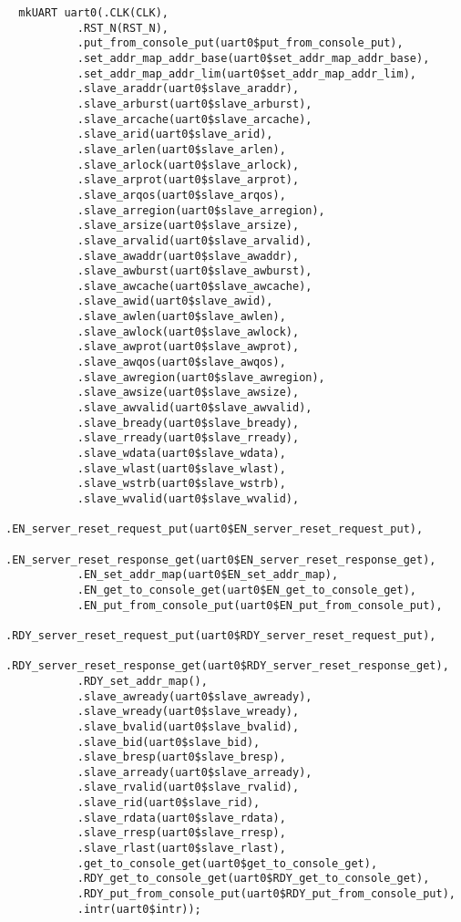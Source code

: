 \documentclass[a4paper,9pt]{report}
\begin{document}
\tiny
\begin{verbatim}
  mkUART uart0(.CLK(CLK),
	       .RST_N(RST_N),
	       .put_from_console_put(uart0$put_from_console_put),
	       .set_addr_map_addr_base(uart0$set_addr_map_addr_base),
	       .set_addr_map_addr_lim(uart0$set_addr_map_addr_lim),
	       .slave_araddr(uart0$slave_araddr),
	       .slave_arburst(uart0$slave_arburst),
	       .slave_arcache(uart0$slave_arcache),
	       .slave_arid(uart0$slave_arid),
	       .slave_arlen(uart0$slave_arlen),
	       .slave_arlock(uart0$slave_arlock),
	       .slave_arprot(uart0$slave_arprot),
	       .slave_arqos(uart0$slave_arqos),
	       .slave_arregion(uart0$slave_arregion),
	       .slave_arsize(uart0$slave_arsize),
	       .slave_arvalid(uart0$slave_arvalid),
	       .slave_awaddr(uart0$slave_awaddr),
	       .slave_awburst(uart0$slave_awburst),
	       .slave_awcache(uart0$slave_awcache),
	       .slave_awid(uart0$slave_awid),
	       .slave_awlen(uart0$slave_awlen),
	       .slave_awlock(uart0$slave_awlock),
	       .slave_awprot(uart0$slave_awprot),
	       .slave_awqos(uart0$slave_awqos),
	       .slave_awregion(uart0$slave_awregion),
	       .slave_awsize(uart0$slave_awsize),
	       .slave_awvalid(uart0$slave_awvalid),
	       .slave_bready(uart0$slave_bready),
	       .slave_rready(uart0$slave_rready),
	       .slave_wdata(uart0$slave_wdata),
	       .slave_wlast(uart0$slave_wlast),
	       .slave_wstrb(uart0$slave_wstrb),
	       .slave_wvalid(uart0$slave_wvalid),
	       .EN_server_reset_request_put(uart0$EN_server_reset_request_put),
	       .EN_server_reset_response_get(uart0$EN_server_reset_response_get),
	       .EN_set_addr_map(uart0$EN_set_addr_map),
	       .EN_get_to_console_get(uart0$EN_get_to_console_get),
	       .EN_put_from_console_put(uart0$EN_put_from_console_put),
	       .RDY_server_reset_request_put(uart0$RDY_server_reset_request_put),
	       .RDY_server_reset_response_get(uart0$RDY_server_reset_response_get),
	       .RDY_set_addr_map(),
	       .slave_awready(uart0$slave_awready),
	       .slave_wready(uart0$slave_wready),
	       .slave_bvalid(uart0$slave_bvalid),
	       .slave_bid(uart0$slave_bid),
	       .slave_bresp(uart0$slave_bresp),
	       .slave_arready(uart0$slave_arready),
	       .slave_rvalid(uart0$slave_rvalid),
	       .slave_rid(uart0$slave_rid),
	       .slave_rdata(uart0$slave_rdata),
	       .slave_rresp(uart0$slave_rresp),
	       .slave_rlast(uart0$slave_rlast),
	       .get_to_console_get(uart0$get_to_console_get),
	       .RDY_get_to_console_get(uart0$RDY_get_to_console_get),
	       .RDY_put_from_console_put(uart0$RDY_put_from_console_put),
	       .intr(uart0$intr));
\end{verbatim}
\normalsize
\end{document}
